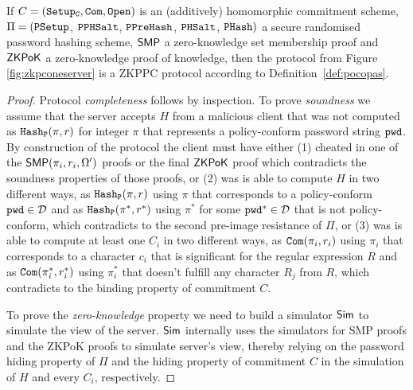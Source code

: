 \begin{theorem}\label{theo:singlegen}
If $C=(\mathtt{Setup_C},\mathtt{Com},\mathtt{Open})$ is an (additively) homomorphic commitment scheme, $\Pi=(\mathtt{PSetup}$, $\mathtt{PPHSalt}$, $\mathtt{PPreHash}$, $\mathtt{PHSalt}$, $\mathtt{PHash})$ a secure randomised password hashing scheme, $\mathsf{SMP}$ a zero-knowledge set membership proof and $\mathsf{ZKPoK}$ a zero-knowledge proof of knowledge, then the protocol from Figure \ref{fig:zkpconeserver} is a ZKPPC protocol according to Definition~\ref{def:pocopas}.
\end{theorem}

\begin{proof}
Protocol \emph{completeness} follows by inspection.
To prove \emph{soundness} we assume that the server accepts $H$ from a malicious client that was not computed as $\mathtt{Hash_P}(\pi,r)$ for integer $\pi$ that represents a policy-conform password string $\mathtt{pwd}$. 
By construction of the protocol the client must have either (1) cheated in one of the $\mathsf{SMP}(\pi_i,r_i,\Omega')$ proofs or the final $\mathsf{ZKPoK}$ proof which contradicts the soundness properties of those proofs, or (2) was is able to compute $H$ in two different ways, as $\mathtt{Hash_P}(\pi,r)$ using $\pi$ that corresponds to a policy-conform $\mathtt{pwd}\in\mathcal{D}$ and as $\mathtt{Hash_P}(\pi^\ast,r^\ast)$ using $\pi^\ast$ for some $\mathtt{pwd}^\ast\in\mathcal{D}$ that is not policy-conform, which contradicts to the second pre-image resistance of $\Pi$, or (3) was is able to compute at least one $C_i$ in two different ways, as $\mathtt{Com}(\pi_i, r_i)$ using $\pi_i$  that corresponds to a character $c_i$ that is significant for the regular expression $R$ and as $\mathtt{Com}(\pi^\ast_i, r^\ast_i)$ using $\pi^\ast_i$ that doesn't fulfill any character $R_j$ from $R$, which contradicts to the binding property of commitment $C$.

To prove the \emph{zero-knowledge} property we need to build a simulator $\mathsf{Sim}$ to simulate the view of the server. 
$\mathsf{Sim}$ internally uses the simulators for SMP proofs and the ZKPoK proofs to simulate server's view, thereby relying on the password hiding property of $\Pi$ and the hiding property of commitment $C$ in the simulation of $H$ and every $C_i$, respectively.
\end{proof}

